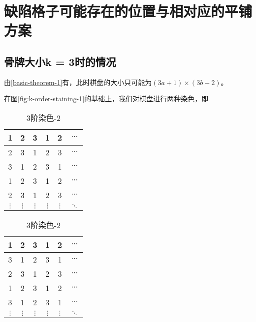 \chapter{缺陷格子可能存在的位置与相对应的平铺方案}

\section{骨牌大小k = 3时的情况}
由\ref*{basic-theorem-1}有，此时棋盘的大小只可能为$(3a + 1) \times (3b + 2)$。

在图\ref*{fig:k-order-staining-1}的基础上，我们对棋盘进行两种染色，即

\begin{table}[h]
	\caption{3阶染色}
	\label{fig:3-order-staining}
	\begin{subtable}{.5\linewidth}
		\centering
		\caption{3阶染色-1}
		\begin{tabular}{|c|c|c|c|c|c|}
			\hline
			1        & 2        & 3        & 1        & 2        & $\cdots$ \\
			\hline
			2        & 3        & 1        & 2        & 3        & $\cdots$ \\
			\hline
			3        & 1        & 2        & 3        & 1        & $\cdots$ \\
			\hline
			1        & 2        & 3        & 1        & 2        & $\cdots$ \\
			\hline
			2        & 3        & 1        & 2        & 3        & $\cdots$ \\
			\hline
			$\vdots$ & $\vdots$ & $\vdots$ & $\vdots$ & $\vdots$ & $\ddots$ \\
			\hline
		\end{tabular}
		\label{fig:3-order-staining-1}
	\end{subtable}%
	\begin{subtable}{.5\linewidth}
		\centering
		\caption{3阶染色-2}
		\begin{tabular}{|c|c|c|c|c|c|}
			\hline
			1        & 2        & 3        & 1        & 2        & $\cdots$ \\
			\hline
			3        & 1        & 2        & 3        & 1        & $\cdots$ \\
			\hline
			2        & 3        & 1        & 2        & 3        & $\cdots$ \\
			\hline
			1        & 2        & 3        & 1        & 2        & $\cdots$ \\
			\hline
			3        & 1        & 2        & 3        & 1        & $\cdots$ \\
			\hline
			$\vdots$ & $\vdots$ & $\vdots$ & $\vdots$ & $\vdots$ & $\ddots$ \\
			\hline
		\end{tabular}
		\label{fig:3-order-staining-2}
	\end{subtable}
\end{table}

